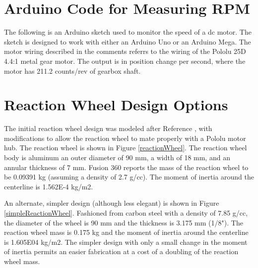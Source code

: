 \documentclass[12pt,letterpaper]{article}
\begin{document}
\begin{appendices}
\section{Arduino Code for Measuring RPM}

The following is an Arduino sketch used to monitor the speed of a dc motor.  The sketch is designed
to work with either an Arduino Uno or an Arduino Mega. The motor wiring described in the comments
referrs to the wiring of the Pololu 25D 4.4:1 metal gear motor.  The output is in position change 
per second, where the motor has 211.2 counts/rev of gearbox shaft. \\



\section{Reaction Wheel Design Options}

The initial reaction wheel design was modeled after Reference \cite{hackaday}, with modifications to allow the reaction wheel
to mate properly with a Pololu motor hub.  The reaction wheel is shown in Figure \ref{reactionWheel}.
The reaction wheel body is aluminum an outer diameter of 90 mm, a width of 18 mm, and an annular thickness of 7 mm. 
Fusion 360 reports the mass of the reaction wheel to be 0.09391 kg (assuming a density of 2.7 g/cc).
The moment of inertia around the centerline is 1.562E-4 kg/m2.

An alternate, simpler design (although less elegant) is shown in Figure \ref{simpleReactionWheel}.
Fashioned from carbon steel with a density of  7.85 g/cc, the diameter of the wheel is 90 mm and the
thickness is 3.175 mm (1/8").  The reaction wheel mass is 0.175 kg and the moment of inertia 
around the centerline is 1.605E04 kg/m2.  The simpler design with only a small change in the moment
of inertia permits an easier fabrication at a cost of a doubling of the reaction wheel mass.





\end{appendices}
\end{document}
